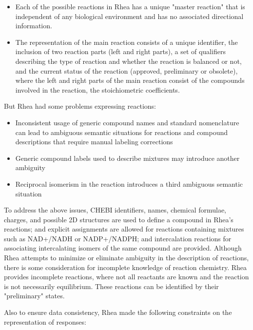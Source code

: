 \documentclass[%
 aip,
 jmp,%
 amsmath,amssymb,
 reprint,%
]{revtex4-2}
\begin{document}
\begin{itemize}
    \item Each of the possible reactions in Rhea has a unique "master reaction" that is independent of any biological environment and has no associated directional information.
    \item The representation of the main reaction consists of a unique identifier, the inclusion of two reaction parts (left and right parts), a set of qualifiers describing the type of reaction and whether the reaction is balanced or not, and the current status of the reaction (approved, preliminary or obsolete), where the left and right parts of the main reaction consist of the compounds involved in the reaction, the stoichiometric coefficients\cite{morgat2012unipathway, moeder1996determination}.
\end{itemize}

But Rhea had some problems expressing reactions:

\begin{itemize}
    \item Inconsistent usage of generic compound names and standard nomenclature can lead to ambiguous semantic situations for reactions and compound descriptions that require manual labeling corrections
    \item Generic compound labels used to describe mixtures may introduce another ambiguity
    \item Reciprocal isomerism in the reaction introduces a third ambiguous semantic situation
\end{itemize}

To address the above issues, CHEBI identifiers, names, chemical formulae, charges, and possible 2D structures\cite{zhou2017promising} are used to define a compound in Rhea's reactions; and explicit assignments are allowed for reactions containing mixtures such as NAD+/NADH or NADP+/NADPH\cite{xia2009roles, ammon1973role}; and intercalation reactions for associating intercalating isomers of the same compound are provided. Although Rhea attempts to minimize or eliminate ambiguity in the description of reactions, there is some consideration for incomplete knowledge of reaction chemistry. Rhea provides incomplete reactions, where not all reactants are known and the reaction is not necessarily equilibrium. These reactions can be identified by their "preliminary" states.

Also to ensure data consistency, Rhea made the following constraints on the representation of responses:
\end{document}
